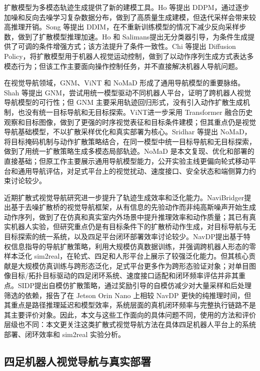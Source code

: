 扩散模型为多模态轨迹生成提供了新的建模工具。Ho 等\cite{ddpm2020}提出 DDPM，通过逐步加噪和反向去噪学习复杂数据分布，做到了高质量生成建模，但迭代采样会带来较高推理开销。Song 等\cite{ddim2020}提出 DDIM，在不重新训练模型的情况下减少反向采样步数，做到了扩散模型推理加速。Ho 和 Salimans\cite{cfg2022}提出无分类器引导，为条件生成提供了可调的条件增强方式；该方法提升了条件一致性。Chi 等\cite{chi2025diffusion}提出 Diffusion Policy，将扩散模型用于机器人视觉运动控制，做到了以动作序列生成方式表达多模态行为；但该工作主要面向操作控制任务，并不直接解决机器人导航问题。

在视觉导航领域，GNM、ViNT 和 NoMaD 形成了通用导航模型的重要脉络。Shah 等\cite{gnm2022}提出 GNM，尝试用统一模型驱动不同机器人平台，证明了跨机器人视觉导航模型的可行性；但 GNM 主要采用轨迹回归形式，没有引入动作扩散生成机制，也没有统一目标导航和无目标探索。ViNT\cite{vint2023}进一步采用 Transformer 融合历史观察和目标图像，做到了更强的时序视觉表征和目标条件建模；但其重点仍是视觉导航基础模型，不以扩散采样优化和真实部署为核心。Sridhar 等\cite{nomad2023}提出 NoMaD，将目标掩码机制与动作扩散策略结合，在同一模型中统一目标导航和无目标探索，做到了用统一扩散策略生成多模态局部轨迹。NoMaD 是本文复现、优化和部署的直接基础；但原工作主要展示通用导航模型能力，公开实验主线更偏向轮式移动平台和通用导航评估，对足式平台上的视觉扰动、速度接口、安全状态和端侧算力约束讨论较少。

近期扩散式视觉导航研究进一步提升了轨迹生成效率和泛化能力。NaviBridger\cite{navibridger2025}提出基于去噪扩散桥的视觉导航框架，从有信息的先验动作而非纯高斯噪声开始生成动作序列，做到了在仿真和真实室内外场景中提升推理效率和动作质量；其已有真实机器人实验，但研究重点仍是有目标条件下的扩散桥动作生成，对目标导航与无目标探索的统一系统，以及四足平台闭环部署效率讨论较少。NavDP\cite{navdp2025}提出基于特权信息指导的导航扩散策略，利用大规模仿真数据训练，并强调跨机器人形态的零样本泛化 sim2real，在轮式、四足和人形平台上展示了较强泛化能力。但其核心贡献是大规模仿真训练与跨形态泛化，足式平台更多作为跨形态验证对象；对单目图像目标/拓扑目标驱动的四足闭环系统、速度接口适配和闭环频率评估并非其重点。SIDP\cite{sidp2026}提出自模仿扩散策略，通过奖励引导的自模仿减少对大量采样和后处理筛选的依赖，报告了在 Jetson Orin Nano 上相较 NavDP 更快的纯推理时间，但其重点是路径推理延迟和模型效率，系统层面的真机闭环频率与完整执行链路不是其主要评价对象。因此，本文与这些工作面向的具体问题不同，使用的方法和评价层级也不同：本文更关注这类扩散式视觉导航方法在具体四足机器人平台上的系统部署、闭环效率和 sim2real 实验分析。

\subsection{四足机器人视觉导航与真实部署}

